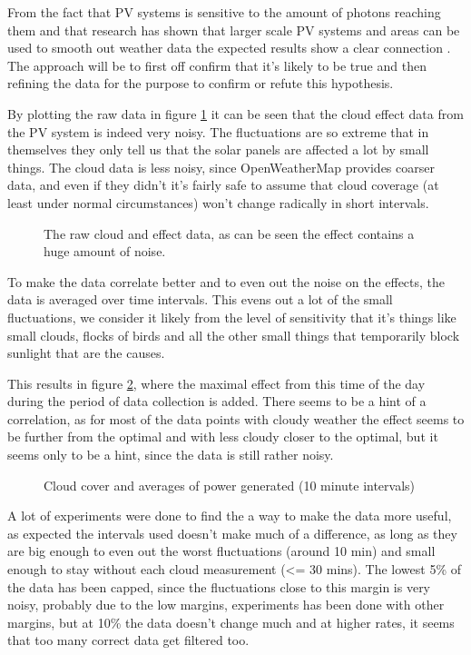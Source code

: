 From the fact that PV systems is sensitive to the amount of photons
reaching them and that research has shown that larger scale PV systems
and areas can be used to smooth out weather data the expected results
show a clear connection \citep{southafrica, cloudTrack, photovoltaic}.
The approach will be to first off confirm that it's likely to be true
and then refining the data for the purpose to confirm or refute this
hypothesis.

By plotting the raw data in figure \ref{fig:noise} it can be seen that
the cloud effect data from the PV system is indeed very noisy.  The
fluctuations are so extreme that in themselves they only tell us that
the solar panels are affected a lot by small things.  The cloud data
is less noisy, since OpenWeatherMap provides coarser data, and even if
they didn't it's fairly safe to assume that cloud coverage (at least
under normal circumstances) won't change radically in short intervals.

\begin{figure}
  \centering
  \tiny
  
  \caption{The raw cloud and effect data, as can be seen the effect
    contains a huge amount of noise.}
  \label{fig:noise}
\end{figure}

To make the data correlate better and to even out the noise on the
effects, the data is averaged over time intervals.  This evens out a
lot of the small fluctuations, we consider it likely from the level of
sensitivity that it's things like small clouds, flocks of birds and
all the other small things that temporarily block sunlight that are
the causes.

This results in figure \ref{fig:cloudsAndPower}, where the maximal
effect from this time of the day during the period of data collection
is added.  There seems to be a hint of a correlation, as for most of
the data points with cloudy weather the effect seems to be further
from the optimal and with less cloudy closer to the optimal, but it
seems only to be a hint, since the data is still rather noisy.

\begin{figure}
  \centering
    \tiny
    
  \caption{Cloud cover and averages of power generated (10 minute
    intervals)}
  \label{fig:cloudsAndPower}
\end{figure}

A lot of experiments were done to find the a way to make the data more
useful, as expected the intervals used doesn't make much of a
difference, as long as they are big enough to even out the worst
fluctuations (around 10 min) and small enough to stay without each
cloud measurement (<= 30 mins).  The lowest 5\% of the data has been
capped, since the fluctuations close to this margin is very noisy,
probably due to the low margins, experiments has been done with other
margins, but at 10\% the data doesn't change much and at higher rates,
it seems that too many correct data get filtered too.

